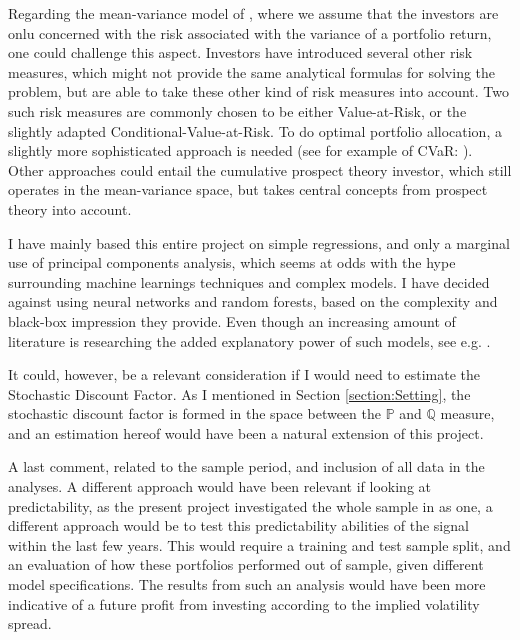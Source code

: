 Regarding the mean-variance model of \cite{markowitz1952portfolio}, where we assume that the investors are onlu concerned with the risk associated with the variance of a portfolio return, one could challenge this aspect. Investors have introduced several other risk measures, which might not provide the same analytical formulas for solving the problem, but are able to take these other kind of risk measures into account. Two such risk measures are commonly chosen to be either Value-at-Risk, or the slightly adapted Conditional-Value-at-Risk. To do optimal portfolio allocation, a slightly more sophisticated approach is needed (see for example of CVaR: \cite{rockafellar2000optimization}). Other approaches could entail the cumulative prospect theory investor, which still operates in the mean-variance space, but takes central concepts from prospect theory into account.

I have mainly based this entire project on simple regressions, and only a marginal use of principal components analysis, which seems at odds with the hype surrounding machine learnings techniques and complex models. I have decided against using neural networks and random forests, based on the complexity and black-box impression they provide. Even though an increasing amount of literature is researching the added explanatory power of such models, see e.g. \cite{weigand2019machine}.

It could, however, be a relevant consideration if I would need to estimate the Stochastic Discount Factor. As I mentioned in Section \ref{section:Setting}, the stochastic discount factor is formed in the space between the $\mathbb{P}$ and $\mathbb{Q}$ measure, and an estimation hereof would have been a natural extension of this project. 

A last comment, related to the sample period, and inclusion of all data in the analyses. A different approach would have been relevant if looking  at predictability, as the present project investigated the whole sample in as one, a different approach would be to test this predictability abilities of the signal within the last few years. This would require a training and test sample split, and an evaluation of how these portfolios performed out of sample, given different model specifications. The results from such an analysis would have been more indicative of a future profit from investing according to the implied volatility spread.

	
